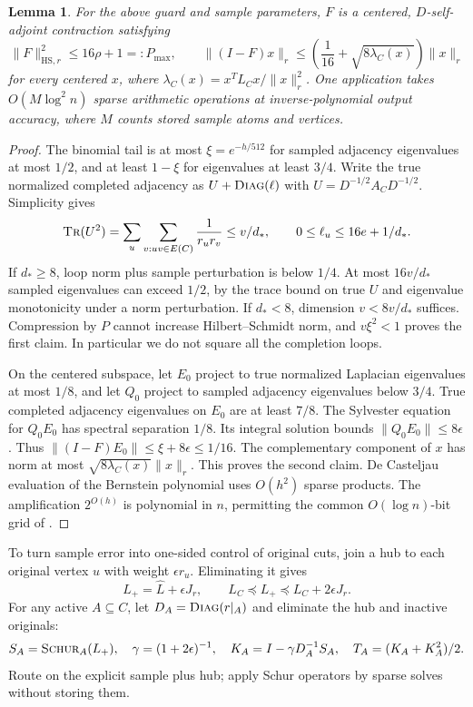 \documentclass[11pt]{article}
\newtheorem{lemma}[theorem]{Lemma}
\theoremstyle{remark}
\newcommand{\diag}{\textsc{Diag}}
\newcommand{\HS}{\mathrm{HS}}
\newcommand{\norm}[1]{\lVert#1\rVert}
\newcommand{\Schur}{\textsc{Schur}}
\newcommand{\tr}{\textsc{Tr}}
\begin{document}
\begin{lemma}\label{struct27:lem:filter}
For the above guard and sample parameters, $F$ is a centered, $D$-self-adjoint
contraction satisfying
\begin{equation}\label{struct27:eq:filterbounds}
 \norm{F}_{\HS,r}^2\le16\rho+1=:P_{\max},\qquad
 \norm{(I-F)x}_r\le\left(\frac1{16}+\sqrt{8\lambda_C(x)}\right)\norm{x}_r
\end{equation}
for every centered $x$, where $\lambda_C(x)=x^TL_Cx/\norm{x}_r^2$.
One application takes $O(M \log^2 n)$ sparse arithmetic operations at
inverse-polynomial output accuracy, where $M$ counts stored sample atoms and
vertices.
\end{lemma} \begin{proof} The binomial tail is at most $\xi=e^{-h/512}$ for
sampled adjacency eigenvalues at most $1/2$, and at least $1-\xi$ for
eigenvalues at least $3/4$.
Write the true normalized completed adjacency as $U+\diag(\ell)$ with
$U=D^{-1/2}A_CD^{-1/2}$.
Simplicity gives
\[
 \tr(U^2)=\sum_u\sum_{v:uv\in E(C)}\frac1{r_ur_v}
 \le v/d_*,\qquad 0\le\ell_u\le16e+1/d_*.
\]
If $d_*\ge8$, loop norm plus sample perturbation is below $1/4$.
At most $16v/d_*$ sampled eigenvalues can exceed $1/2$, by the trace bound on
true $U$ and eigenvalue monotonicity under a norm perturbation.
If $d_*<8$, dimension $v<8v/d_*$ suffices.
Compression by $P$ cannot increase Hilbert--Schmidt norm, and $v\xi^2<1$ proves
the first claim.
In particular we do not square all the completion loops.

On the centered subspace, let $E_0$ project to true normalized Laplacian
eigenvalues at most $1/8$, and let $Q_0$ project to sampled adjacency
eigenvalues below $3/4$.
True completed adjacency eigenvalues on $E_0$ are at least $7/8$.
The Sylvester equation for $Q_0E_0$ has spectral separation $1/8$.
Its integral solution bounds $\norm{Q_0E_0}\le8\epsilon$.
Thus $\norm{(I-F)E_0}\le\xi+8\epsilon\le1/16$.
The complementary component of $x$ has norm at most
$\sqrt{8\lambda_C(x)}\norm{x}_r$.
This proves the second claim.
De Casteljau evaluation of the Bernstein polynomial uses $O(h^2)$ sparse
products.
The amplification $2^{O(h)}$ is polynomial in $n$, permitting the common
$O(\log n)$-bit grid of .
\end{proof}

To turn sample error into one-sided control of original cuts, join a hub to each
original vertex $u$ with weight $\epsilon r_u$.
Eliminating it gives
\begin{equation}\label{struct27:eq:hub}
 L_+=\widehat L+\epsilon J_r,\qquad
 L_C\preceq L_+\preceq L_C+2\epsilon J_r.
\end{equation}
For any active $A\subseteq C$, let $D_A=\diag(r|_A)$ and eliminate the hub and
inactive originals:
\[
 S_A=\Schur_A(L_+),\quad \gamma=(1+2\epsilon)^{-1},\quad
 K_A=I-\gamma D_A^{-1}S_A,\quad T_A=(K_A+K_A^2)/2.
\]
Route on the explicit sample plus hub; apply Schur operators by sparse solves
without storing them.
\end{document}

